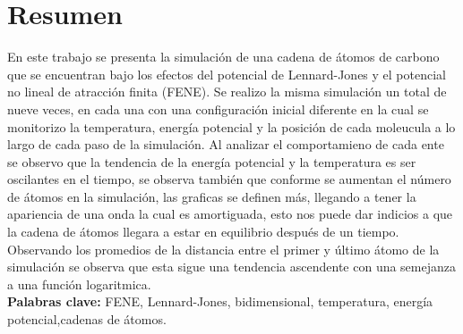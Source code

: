 \section{Resumen}
En este trabajo se presenta la simulación de una cadena de átomos de carbono que se encuentran bajo los efectos del potencial
de Lennard-Jones y el potencial no lineal de atracción finita (FENE). Se realizo la misma simulación un total de nueve veces, en cada una
con una configuración inicial diferente en la cual se monitorizo la temperatura, energía potencial y la posición de cada moleucula a lo largo de 
cada paso de la simulación. Al analizar el comportamieno de cada ente se observo que la tendencia de la energía potencial y la temperatura es ser oscilantes
en el tiempo, se observa también que conforme se aumentan el número de átomos en la simulación, las graficas se definen más, llegando a tener la apariencia de una onda la cual es 
amortiguada, esto nos puede dar indicios a que la cadena de átomos llegara a estar en equilibrio después de un tiempo. Observando los promedios de la distancia entre el primer y último átomo de la simulación
se observa que esta sigue una tendencia ascendente con una semejanza a una función logaritmica.\\
\textbf{Palabras clave:} FENE, Lennard-Jones, bidimensional, temperatura, energía potencial,cadenas de átomos.